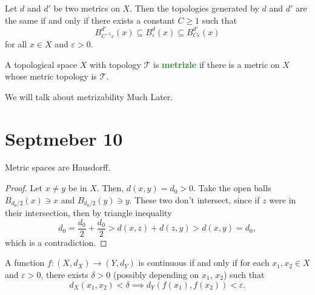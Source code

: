 \documentclass[11pt]{scrartcl}
\providecommand{\eps}{\varepsilon}
\providecommand{\inv}{^{-1}}
\providecommand{\vocab}[1]{{\textbf{\textcolor{ForestGreen}{#1}}}}
\begin{document}
\begin{theorem}
    \label{thm:equivalent-metrics}
    Let $d$ and $d'$ be two metrics on $X$.
    Then the topologies generated by $d$ and $d'$ are the same
    if and only if there exists a constant $C\ge1$ such that
    \begin{equation*}
	B^{d'}_{C\inv\eps}(x)\subseteq B^d_\eps(x)
	\subseteq B^{d'}_{C\eps}(x)
    \end{equation*}
    for all $x\in X$ and $\eps>0$.
\end{theorem}

\begin{definition}[Metrizable]
    \label{def:metrizable}
    A topological space $X$ with topology $\mathcal T$ is \vocab{metrizle}
    if there is a metric on $X$ whose metric topology is $\mathcal T$.
\end{definition}

We will talk about metrizability Much Later.

\section{Septmeber 10}\label{sec:sep10}

\begin{prop}
    \label{prop:metric-spaces-hausdorff}
    Metric spaces are Hausdorff.
\end{prop}

\begin{proof}
    Let $x\ne y$ be in $X$. Then, $d(x,y) = d_0 > 0$.
    Take the open balls $B_{d_0/2}(x)\ni x$ and $B_{d_0/2}(y)\ni y$.
    These two don't intersect, since if $z$ were in their intersection,
    then by triangle inequality
    \begin{equation*}
	d_0 = \frac {d_0}2 + \frac {d_0}2 > d(x,z) + d(z,y) > d(x,y) = d_0,
    \end{equation*}
    which is a contradiction.
\end{proof}

\begin{theorem}[$\eps$-$\delta$ continuity]
    \label{thm:eps-delta-continuity-metric-space}
    A function $f\colon (X,d_X)\to(Y,d_Y)$ is continuous
    if and only if for each $x_1,x_2\in X$ and $\eps>0$,
    there exists $\delta>0$ (possibly depending on $x_1$, $x_2$)
    such that
    \begin{equation*}
        d_X(x_1,x_2)<\delta\implies d_Y(f(x_1),f(x_2)) < \eps.
    \end{equation*}
\end{theorem}
\end{document}
